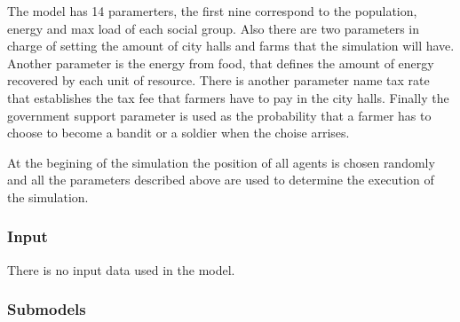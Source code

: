 \documentclass{wscpaperproc}
\begin{document}
The model has 14 paramerters, the first nine correspond to the population,
energy and max load of each social group. Also there are two parameters in
charge of setting the amount of city halls and farms that the simulation will
have. Another parameter is the energy from food, that defines the amount of
energy recovered by each unit of resource. There is another parameter name tax
rate that establishes the tax fee that farmers have to pay in the city halls.
Finally the government support parameter is used as the probability that a
farmer has to choose to become a bandit or a soldier when the choise arrises.

At the begining of the simulation the position of all agents is chosen randomly
and all the parameters described above are used to determine the execution of
the simulation.

\subsubsection{Input}

There is no input data used in the model.

\subsubsection{Submodels}
\end{document}
